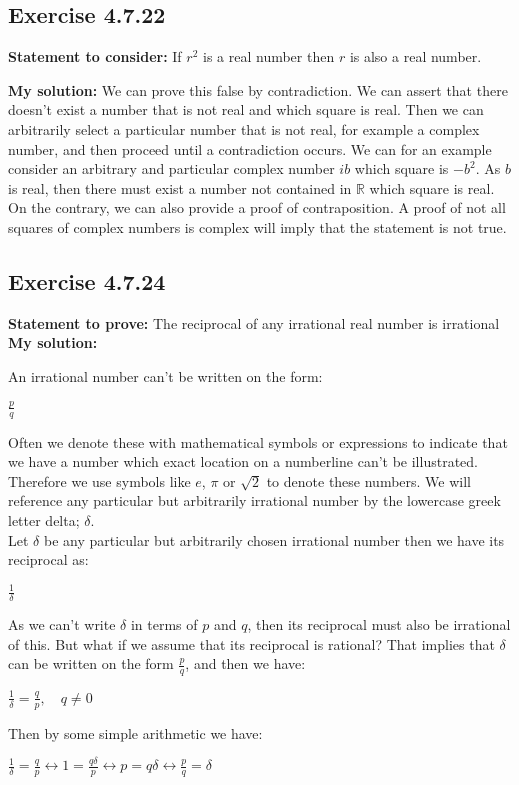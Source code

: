 \documentclass{article}
\newcommand{\cent}[1]{\begin{center}#1\end{center}}
\newcommand{\doubleR}{\mathbb{R}}
\newcommand{\Prove}{\textbf{Statement to prove: }}
\newcommand{\Remark}{\textbf{Statement to consider: }}
\newcommand{\Solution}{\textbf{My solution: }}
\newcommand{\Exercise}[1]{\subsection*{Exercise #1}}
\begin{document}
	\Exercise{4.7.22}
	
	\Remark
	If $r^2$ is a real number then $r$ is also a real number.
	
	\Solution
	We can prove this false by contradiction. We can assert that there doesn't exist a number that is not real and which square is real. Then we can arbitrarily select a particular number that is not real, for example a complex number, and then proceed until a contradiction occurs. We can for an example consider an arbitrary and particular complex number $ib$ which square is $-b^2$. As $b$ is real, then there must exist a number not contained in $\doubleR$ which square is real.\\
	
	On the contrary, we can also provide a proof of contraposition. A proof of not all squares of complex numbers is complex will imply that the statement is not true.\\
	
	\Exercise{4.7.24}
	
	\Prove
	The reciprocal of any irrational real number is irrational\\
	
	\Solution
	
	An irrational number can't be written on the form:
	
	\cent{$\frac{p}{q}$}
	
	Often we denote these with mathematical symbols or expressions to indicate that we have a number which exact location on a numberline can't be illustrated. Therefore we use symbols like $e$, $\pi$ or $\sqrt{2}$ to denote these numbers. We will reference any particular but arbitrarily irrational number by the lowercase greek letter delta; $\delta$.\\
	
	Let $\delta$ be any particular but arbitrarily chosen irrational number then we have its reciprocal as:
	
	\cent{$\frac{1}{\delta}$}
	
	As we can't write $\delta$ in terms of $p$ and $q$, then its reciprocal must also be irrational of this. But what if we assume that its reciprocal is rational? That implies that $\delta$ can be written on the form $\frac{p}{q}$, and then we have:
	
	\cent{$\frac{1}{\delta} = \frac{q}{p}, \quad q \neq 0$}
	
	Then by some simple arithmetic we have:
	
	\cent{$\frac{1}{\delta} = \frac{q}{p} \leftrightarrow 1=\frac{q\delta}{p} \leftrightarrow p = q \delta  \leftrightarrow \frac{p}{q} = \delta$}
	
\end{document}
